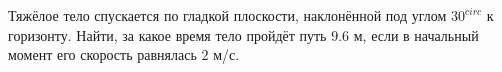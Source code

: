 Тяжёлое тело спускается по гладкой плоскости, наклонённой под углом
$30^{circ}$ к горизонту. Найти, за какое время тело пройдёт путь $9.6$
м, если в начальный момент его скорость равнялась $2$ м/с.
